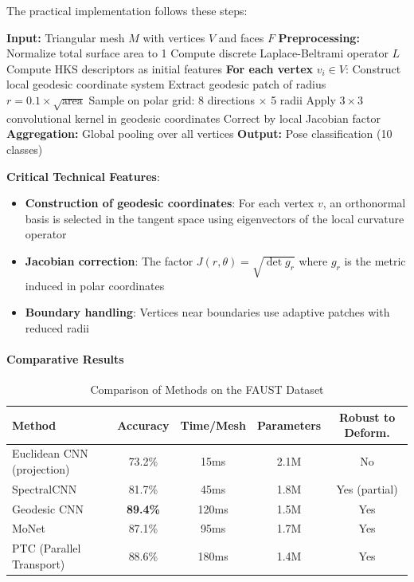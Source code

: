 \begin{example}
The practical implementation follows these steps:

\begin{algorithm}[H]
\caption{Geodesic CNN for FAUST Pose Classification}
\begin{algorithmic}[1]
    \State \textbf{Input:} Triangular mesh $M$ with vertices $V$ and faces $F$
    \State \textbf{Preprocessing:}
    \State \quad Normalize total surface area to 1
    \State \quad Compute discrete Laplace-Beltrami operator $L$
    \State \quad Compute HKS descriptors as initial features
    \State \textbf{For each vertex} $v_i \in V$:
    \State \quad \quad Construct local geodesic coordinate system
    \State \quad \quad Extract geodesic patch of radius $r = 0.1 \times \sqrt{\text{area}}$
    \State \quad \quad Sample on polar grid: 8 directions $\times$ 5 radii
    \State \quad \quad Apply $3 \times 3$ convolutional kernel in geodesic coordinates
    \State \quad \quad Correct by local Jacobian factor
    \State \textbf{Aggregation:} Global pooling over all vertices
    \State \textbf{Output:} Pose classification (10 classes)
\end{algorithmic}
\end{algorithm}

\textbf{Critical Technical Features}:
\begin{itemize}
    \item \textbf{Construction of geodesic coordinates}: For each vertex $v$, an orthonormal basis is selected in the tangent space using eigenvectors of the local curvature operator
    \item \textbf{Jacobian correction}: The factor $J(r, \theta) = \sqrt{\det g_r}$ where $g_r$ is the metric induced in polar coordinates
    \item \textbf{Boundary handling}: Vertices near boundaries use adaptive patches with reduced radii
\end{itemize}
\end{example}

\paragraph{Comparative Results}

\begin{table}[h]
\centering
\caption{Comparison of Methods on the FAUST Dataset}
\label{tab:faust_comparison}
\begin{tabular}{lcccc}
\hline
\textbf{Method} & \textbf{Accuracy} & \textbf{Time/Mesh} & \textbf{Parameters} & \textbf{Robust to Deform.} \\
\hline
Euclidean CNN (projection) & 73.2\% & 15ms & 2.1M & No \\
SpectralCNN & 81.7\% & 45ms & 1.8M & Yes (partial) \\
Geodesic CNN & \textbf{89.4\%} & 120ms & 1.5M & Yes \\
MoNet & 87.1\% & 95ms & 1.7M & Yes \\
PTC (Parallel Transport) & 88.6\% & 180ms & 1.4M & Yes \\
\hline
\end{tabular}
\end{table}

